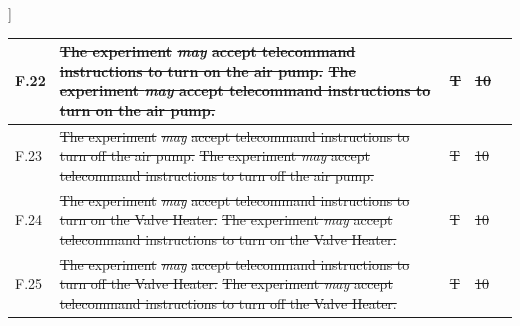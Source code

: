 ]\documentclass[a4paper,12pt,twoside]{article}
\providecommand{\DIFaddtex}[1]{{\protect\color{blue}\uwave{#1}}} %
\providecommand{\DIFdeltex}[1]{{\protect\color{red}\sout{#1}}}                      %
\providecommand{\DIFaddbegin}{} %
\providecommand{\DIFaddend}{} %
\providecommand{\DIFdelbegin}{} %
\providecommand{\DIFdelend}{} %
\providecommand{\DIFadd}[1]{\texorpdfstring{\DIFaddtex{#1}}{#1}} %
\providecommand{\DIFdel}[1]{\texorpdfstring{\DIFdeltex{#1}}{}} %
\newcommand{\DIFscaledelfig}{0.5}
\newlength{\DIFdelgraphicswidth} %
\newlength{\DIFdelgraphicsheight} %
\newcommand{\DIFaddincludegraphics}[2][]{{\color{blue}\fbox{\DIFOincludegraphics[#1]{#2}}}} %
\newcommand{\DIFdelincludegraphics}[2][]{%
\sbox{\DIFdelgraphicsbox}{\DIFOincludegraphics[#1]{#2}}%
\settoboxwidth{\DIFdelgraphicswidth}{\DIFdelgraphicsbox} %
\settoboxtotalheight{\DIFdelgraphicsheight}{\DIFdelgraphicsbox} %
\scalebox{\DIFscaledelfig}{%
\parbox[b]{\DIFdelgraphicswidth}{\usebox{\DIFdelgraphicsbox}\\[-\baselineskip] \rule{\DIFdelgraphicswidth}{0em}}\llap{\resizebox{\DIFdelgraphicswidth}{\DIFdelgraphicsheight}{%
\setlength{\unitlength}{\DIFdelgraphicswidth}%
\begin{picture}(1,1)%
\thicklines\linethickness{2pt} %
{\color[rgb]{1,0,0}\put(0,0){\framebox(1,1){}}}%
{\color[rgb]{1,0,0}\put(0,0){\line( 1,1){1}}}%
{\color[rgb]{1,0,0}\put(0,1){\line(1,-1){1}}}%
\end{picture}%
}\hspace*{3pt}}} %
} %
\DeclareRobustCommand{\DIFaddbegin}{\DIFOaddbegin \let\includegraphics\DIFaddincludegraphics} %
\DeclareRobustCommand{\DIFaddend}{\DIFOaddend \let\includegraphics\DIFOincludegraphics} %
\DeclareRobustCommand{\DIFdelbegin}{\DIFOdelbegin \let\includegraphics\DIFdelincludegraphics} %
\DeclareRobustCommand{\DIFdelend}{\DIFOaddend \let\includegraphics\DIFOincludegraphics} %
\begin{document}
\begin{longtable}[]{|m{}| m{} |m{} |m{}|m{}|}
F.22 & \DIFdelbegin \DIFdel{The experiment }\textit{\DIFdel{may}} %
\DIFdel{accept telecommand instructions to turn on the air pump.                                                                                             }\DIFdelend \DIFaddbegin \st{The experiment \textit{may} accept telecommand instructions to turn on the air pump.}\DIFadd{\textsuperscript{\ref{fn:unnecessary-requirement}}                                                                                              }\DIFaddend &      \DIFdelbegin \DIFdel{T        }\DIFdelend \DIFaddbegin \DIFadd{-        }\DIFaddend & \DIFdelbegin \DIFdel{10            }\DIFdelend \DIFaddbegin \DIFadd{-            }\DIFaddend &        \\ \hline
F.23 & \DIFdelbegin \DIFdel{The experiment }\textit{\DIFdel{may}} %
\DIFdel{accept telecommand instructions to turn off the air pump.                                                                                            }\DIFdelend \DIFaddbegin \st{The experiment \textit{may} accept telecommand instructions to turn off the air pump.}\DIFadd{\textsuperscript{\ref{fn:unnecessary-requirement}}                                                                                             }\DIFaddend &      \DIFdelbegin \DIFdel{T       }\DIFdelend \DIFaddbegin \DIFadd{-       }\DIFaddend & \DIFdelbegin \DIFdel{10            }\DIFdelend \DIFaddbegin \DIFadd{-            }\DIFaddend &        \\ \hline
F.24 & \DIFdelbegin \DIFdel{The experiment }\textit{\DIFdel{may}} %
\DIFdel{accept telecommand instructions to turn on the Valve Heater.                                                                                         }\DIFdelend \DIFaddbegin \st{The experiment \textit{may} accept telecommand instructions to turn on the Valve Heater.}\DIFadd{\textsuperscript{\ref{fn:unnecessary-requirement}}                                                                                          }\DIFaddend &      \DIFdelbegin \DIFdel{T        }\DIFdelend \DIFaddbegin \DIFadd{-        }\DIFaddend & \DIFdelbegin \DIFdel{10            }\DIFdelend \DIFaddbegin \DIFadd{-            }\DIFaddend &        \\ \hline
F.25 & \DIFdelbegin \DIFdel{The experiment }\textit{\DIFdel{may}} %
\DIFdel{accept telecommand instructions to turn off the Valve Heater.                                                                                        }\DIFdelend \DIFaddbegin \st{The experiment \textit{may} accept telecommand instructions to turn off the Valve Heater.}\DIFadd{\textsuperscript{\ref{fn:unnecessary-requirement}}                                                                                         }\DIFaddend &      \DIFdelbegin \DIFdel{T        }\DIFdelend \DIFaddbegin \DIFadd{-        }\DIFaddend & \DIFdelbegin \DIFdel{10            }\DIFdelend \DIFaddbegin \DIFadd{-            }\DIFaddend &        \\ \hline

\end{longtable}
\end{document}
